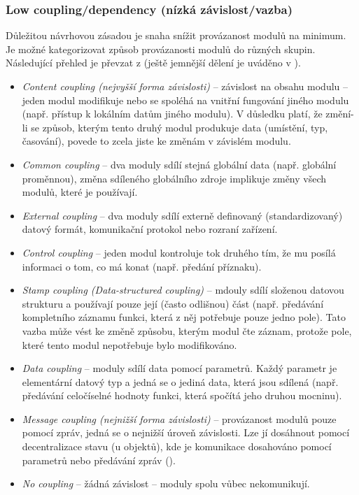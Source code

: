 \subsubsection{Low coupling/dependency (nízká závislost/vazba)}
Důležitou návrhovou zásadou je snaha snížit provázanost modulů na minimum. Je možné kategorizovat způsob provázanosti modulů do různých skupin. Následující přehled je převzat z \cite{wiki:coupling} (ještě jemnější dělení je uváděno v \cite{STVR:STVR162}).

\begin{itemize}
\item\emph{Content coupling (nejvyšší forma závislosti)} -- závislost na obsahu modulu -- jeden modul modifikuje nebo se spoléhá na vnitřní fungování jiného modulu (např. přístup k lokálním datům jiného modulu). V důsledku platí, že změní-li se způsob, kterým tento druhý modul produkuje data (umístění, typ, časování), povede to zcela jiste ke změnám v závislém modulu.
\item\emph{Common coupling} -- dva moduly sdílí stejná globální data (např. globální proměnnou), změna sdíleného globálního zdroje implikuje změny všech modulů, které je používají.
\item\emph{External coupling} -- dva moduly sdílí externě definovaný (standardizovaný) datový formát, komunikační protokol nebo rozraní zařízení.
\item\emph{Control coupling} -- jeden modul kontroluje tok druhého tím, že mu posílá informaci o tom, co má konat (např. předání  příznaku).
\item\emph{Stamp coupling (Data-structured coupling)} -- mdouly sdílí složenou datovou strukturu a používají pouze její (často odlišnou) část (např. předávání kompletního záznamu funkci, která z něj potřebuje pouze jedno pole). Tato vazba může vést ke změně způsobu, kterým modul čte záznam, protože pole, které tento modul nepotřebuje bylo modifikováno.
\item\emph{Data coupling} -- moduly sdílí data pomocí parametrů. Každý parametr je elementární datový typ a jedná se o jediná data, která jsou sdílená (např. předávání celočíselné hodnoty funkci, která spočítá jeho druhou mocninu).
\item\emph{Message coupling (nejnižší forma závislosti)} -- provázanost modulů pouze pomocí zpráv, jedná se o nejnižší úroveň závislosti. Lze jí dosáhnout pomocí decentralizace stavu (u objektů), kde je komunikace dosahováno pomocí parametrů nebo předávání zpráv ().
\item\emph{No coupling} -- žádná závislost -- moduly spolu vůbec nekomunikují.
\end{itemize}

